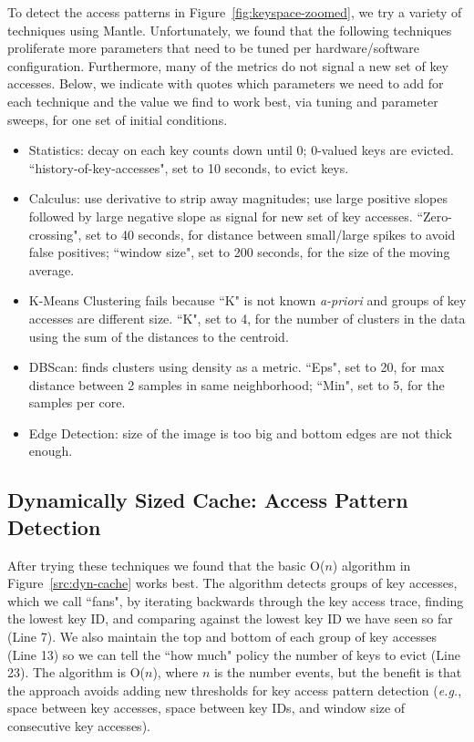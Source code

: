 To detect the access patterns in Figure~\ref{fig:keyspace-zoomed}, we try a
variety of techniques using Mantle. Unfortunately, we found that the following
techniques proliferate more parameters that need to be tuned per
hardware/software configuration. Furthermore, many of the metrics do not signal
a new set of key accesses.  Below, we indicate with quotes which parameters we
need to add for each technique and the value we find to work best, via
tuning and parameter sweeps, for one set of initial conditions.

\begin{itemize}

  \item Statistics: decay on each key counts down until 0; 0-valued keys are
evicted.  ``history-of-key-accesses", set to 10 seconds, to evict keys.

  \item Calculus: use derivative to strip away magnitudes; use large positive
slopes followed by large negative slope as signal for new set of key accesses.
``Zero-crossing", set to 40 seconds, for distance between small/large spikes to
avoid false positives; ``window size", set to 200 seconds, for the size of the
moving average.

  \item K-Means Clustering fails because ``K" is not known {\it a-priori} and
groups of key accesses are different size. ``K", set to 4, for the number of clusters in the data
using the sum of the distances to the centroid.

  \item DBScan: finds clusters using density as a metric. ``Eps", set to 20, for
max distance between 2 samples in same neighborhood; ``Min", set to 5, for the
samples per core.

  \item Edge Detection: size of the image is too big and bottom edges are
not thick enough.

\end{itemize}

\subsection{Dynamically Sized Cache: Access Pattern Detection}
\label{sec:regime-detection}

After trying these techniques we found that the basic O(\(n\)) algorithm in
Figure~\ref{src:dyn-cache} works best. The algorithm detects groups of key
accesses, which we call ``fans", by iterating backwards through the key access
trace, finding the lowest key ID, and comparing against the lowest key ID we
have seen so far (Line 7). We also maintain the top and bottom of each group of
key accesses (Line 13) so we can tell the ``how much" policy the number of keys
to evict (Line 23).  The algorithm is O(\(n\)), where \(n\) is the number
events, but the benefit is that the approach avoids adding new thresholds for
key access pattern detection ({\it e.g.}, space between key accesses, space
between key IDs, and window size of consecutive key accesses).

